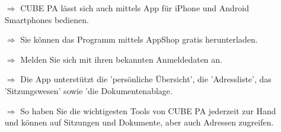 \documentclass{article}
\begin{document}
\begin{multicols}{2}

\begin{tcolorbox}[colback=blue!5,colframe=blue!40!black,title=Mobile CUBE PA Version]
\begin{itemize}
  \item[$\Longrightarrow$] CUBE PA lässt sich auch mittels App für iPhone und Android Smartphones bedienen.
  \item[$\Longrightarrow$] Sie können das Programm mittels AppShop gratis herunterladen.
  \item[$\Longrightarrow$] Melden Sie sich mit ihren bekannten Anmeldedaten an.
  \item[$\Longrightarrow$] Die App unterstützt die 'persönliche Übersicht', die 'Adressliste', das 'Sitzungswesen' sowie 'die Dokumentenablage.
	\item[$\Longrightarrow$] So haben Sie die wichtigesten Tools von CUBE PA jederzeit zur Hand und können auf Sitzungen und Dokumente, aber auch Adressen zugreifen.
\end{itemize}
\begin{centering}
\end{centering}
\end{tcolorbox}




\end{multicols}


\end{document}
